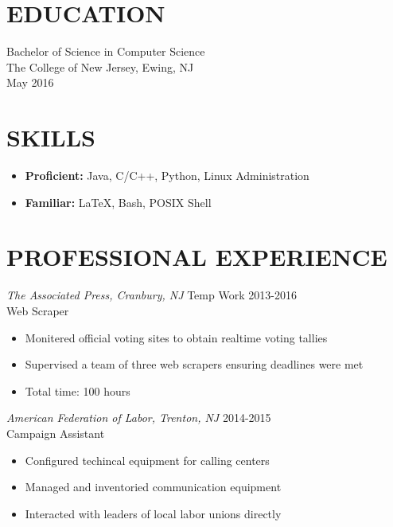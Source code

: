 \documentclass[line,overlap]{res}
\begin{document}
\address{215 Inland Avenue \\ Ewing, NJ 08628 \\ (609) 462-0663}
\address{Email: andrewmiller237@gmail.com}

\begin{resume}

\section{EDUCATION}
	Bachelor of Science in Computer Science \\
	The College of New Jersey, Ewing, NJ    \\
	May 2016

\section{SKILLS}
	\begin{itemize}
		\item {\bf Proficient:} Java, C/C++, Python, Linux Administration
		\item {\bf Familiar:} \LaTeX, Bash, POSIX Shell
	\end{itemize}

\section{PROFESSIONAL EXPERIENCE}

	\textit{The Associated Press, Cranbury, NJ} \hfill Temp Work 2013-2016 \\
	Web Scraper
		\begin{itemize}
			\item Monitered official voting sites to obtain realtime voting tallies
			\item Supervised a team of three web scrapers ensuring deadlines were met
			\item Total time: 100 hours
		\end{itemize}

	\textit{American Federation of Labor, Trenton, NJ} \hfill 2014-2015 \\
	Campaign Assistant
		\begin{itemize}
			\item Configured techincal equipment for calling centers
			\item Managed and inventoried communication equipment
			\item Interacted with leaders of local labor unions directly
		\end{itemize}


\end{resume}
\end{document}
